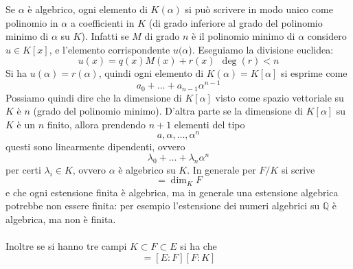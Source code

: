 \begin{osservazione}
	Se $\alpha$ è algebrico, ogni elemento di $K(\alpha)$ si può scrivere in modo unico come polinomio in $\alpha$ a coefficienti in $K$ (di grado inferiore al grado del polinomio minimo di $\alpha$ su $K$). Infatti se $M$ di grado $n$ è il polinomio minimo di $\alpha$ considero $u\in K[x]$, e l'elemento corrispondente $u(\alpha$). Eseguiamo la divisione euclidea:
	\begin{equation*}
	u(x)=q(x)M(x)+r(x) \ \ \deg(r)<n
	\end{equation*}
	Si ha $u(\alpha)=r(\alpha)$, quindi ogni elemento di $K(\alpha)=K[\alpha]$ si esprime come 
	\begin{equation*}
	a_0+\dots+a_{n-1}\alpha^{n-1}
	\end{equation*}
	Possiamo quindi dire che la dimensione di $K[\alpha]$ visto come spazio vettoriale su $K$ è $n$ (grado del polinomio minimo). D'altra parte se la dimensione di $K[\alpha]$ su $K$ è un $n$ finito, allora prendendo $n+1$ elementi del tipo
	\begin{equation*}
	a,\alpha,\dots,\alpha^n
	\end{equation*}
	questi sono linearmente dipendenti, ovvero
	\begin{equation*}
	\lambda_0+\dots+\lambda_n\alpha^n
	\end{equation*}
	per certi $\lambda_i\in K$, ovvero $\alpha$ è algebrico su $K$.
	In generale per $F/K$ si scrive 
	\begin{equation*}
	[F:K]=\dim_K F
	\end{equation*}
	e che ogni estensione finita è algebrica, ma in generale una estensione algebrica potrebbe non essere finita: per esempio l'estensione dei numeri algebrici su $\mathbb{Q}$ è algebrica, ma non è finita. \\ \\ Inoltre se si hanno tre campi $K\subset F\subset E$ si ha che 
	\begin{equation*}
	[E:K]=[E:F][F:K]
	\end{equation*}
\end{osservazione}


